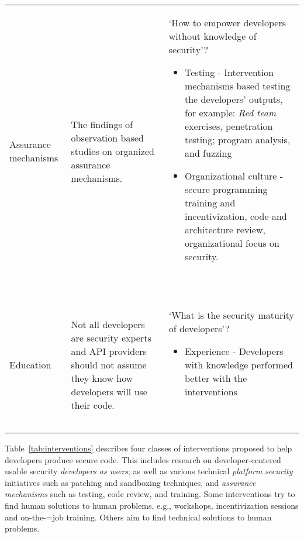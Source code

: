 \documentclass[conference]{IEEEtran}
\begin{document}
\begin{table*}
\begin{tabular}{p{} p{} p{}}
    Assurance mechanisms & The findings of observation based studies on organized assurance mechanisms. & `How to empower developers without knowledge of security'?
    \begin{itemize}
    \item Testing - Intervention mechanisms based testing the developers' outputs, for example: \emph{Red team} exercises, penetration testing; program analysis, and fuzzing
    \item Organizational culture - secure programming training and incentivization, code and architecture review, organizational focus on security.
    \end{itemize}
                                                                                                          ~\cite{ayewah2008,weir2020,rahman2016,weir2016,adoption2014,witschey2015,jose2016,tondel2008,haney2018,thomas2018,poller2017, zhuaside2013,nguyen2017}\\
    \addlinespace
    Education &  Not all developers are security experts and API providers should not assume they know how developers will use their code. & `What is the security maturity of developers'?
    \begin{itemize}
    \item Experience - Developers with knowledge performed better with the interventions
    \end{itemize}
                                                                                                                                              ~\cite{madiha2017,zhu2014,tyler2015,whitney2015,lipford2016,oltroggepin2015,loiacono2017ido,naiakshina2019,haney2018,  witschey2015,acarusability2017,weir2020,adoption2014,linden2020,hala2016}\\
    \bottomrule
  \end{tabular}
\end{table*}
Table~\ref{tab:interventions} describes four classes of interventions proposed to help developers produce secure code. This includes research on developer-centered usable security \emph{developers as users}; as well as various technical \emph{platform security} initiatives such as patching and sandboxing techniques, and \emph{assurance mechanisms} such as testing, code review, and training.  Some interventions try to find human solutions to human problems, e.g., workshops, incentivization sessions and on-the-=job training. Others aim to find technical solutions to human problems. %
\end{document}
